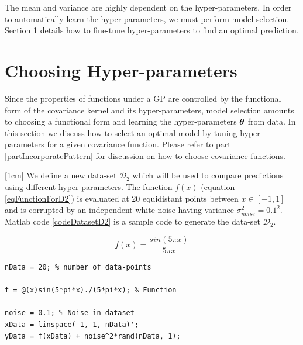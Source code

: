 The mean and variance are highly dependent on the hyper-parameters. In order to automatically learn the hyper-parameters, we must perform model selection. Section \ref{secHyperParameter} details how to fine-tune hyper-parameters to find an optimal prediction.

\section{Choosing Hyper-parameters}\label{secHyperParameter}
Since the properties of functions under a GP are controlled by the functional form of the covariance kernel and its hyper-parameters, model selection amounts to choosing a functional form and learning the hyper-parameters $\boldsymbol{\theta}$ from data. In this section we discuss how to select an optimal model by tuning hyper-parameters for a given covariance function. Please refer to part \ref{partIncorporatePattern} for discussion on how to choose covariance functions. 

[1cm]
We define a new data-set $\mathcal{D}_{2}$ which will be used to compare predictions using different hyper-parameters. The function $f(x)$ (equation \ref{eqFunctionForD2}) is evaluated at 20 equidistant points between $x \in [-1, 1]$ and is corrupted by an independent white noise having variance $\sigma_{noise}^2 = 0.1^2$. Matlab code \ref{codeDatasetD2} is a sample code to generate the data-set  $\mathcal{D}_{2}$. 

\begin{equation}\label{eqFunctionForD2}
f(x) = \frac{sin(5 \pi x)}{5 \pi x}
\end{equation}

\begin{mdframed}[hidealllines=true,backgroundcolor=lightgray!20]
\begin{lstlisting}[caption={Code for data-set D2}, 
                    captionpos=b, 
                    label={codeDatasetD2},
                    style=Matlab-editor,
                    basicstyle=\color{black}\ttfamily\small,
                    backgroundcolor = \color{MatlabCellColour}]
nData = 20; % number of data-points

f = @(x)sin(5*pi*x)./(5*pi*x); % Function

noise = 0.1; % Noise in dataset
xData = linspace(-1, 1, nData)';
yData = f(xData) + noise^2*rand(nData, 1);

\end{lstlisting}
\end{mdframed}

